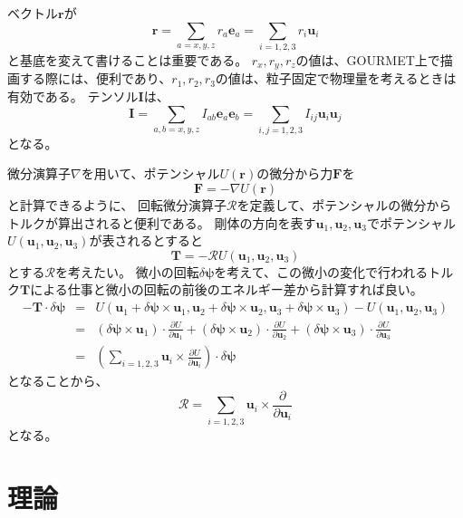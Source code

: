 \documentclass[a4paper,11pt]{jbook}
\def\vecR {\bm {\mathcal {R} } }
\begin{document}
ベクトル$\bm{r}$が
\begin{equation}
\bm{r}=\sum_{a=x,y,z}r_a\bm{e}_a=\sum_{i=1,2,3}r_i\bm{u}_i
\end{equation}
と基底を変えて書けることは重要である。
$r_x,r_y,r_z$の値は、GOURMET上で描画する際には、便利であり、$r_1,r_2,r_3$の値は、粒子固定で物理量を考えるときは有効である。
テンソル$\bm{I}$は、
\begin{equation}
\bm{I}=\sum_{a,b=x,y,z}I_{ab}\bm{e}_a\bm{e}_b=\sum_{i,j=1,2,3}I_{ij}\bm{u}_i\bm{u}_j
\end{equation}
となる。

微分演算子$\nabla$を用いて、ポテンシャル$U(\bm{r})$の微分から力$\bm{F}$を
\begin{equation}
\bm{F}=-\nabla U(\bm{r})
\end{equation}
と計算できるように、
回転微分演算子$\vecR$を定義して、ポテンシャルの微分からトルクが算出されると便利である。
剛体の方向を表す$\bm{u}_1,\bm{u}_2,\bm{u}_3$でポテンシャル$U(\bm{u}_1,\bm{u}_2,\bm{u}_3)$が表されるとすると
\begin{equation}
\bm{T}=-\vecR U(\bm{u}_1,\bm{u}_2,\bm{u}_3)
\end{equation}
とする$\vecR$を考えたい。
微小の回転$\delta\bm{\psi}$を考えて、この微小の変化で行われるトルク$\bm{T}$による仕事と微小の回転の前後のエネルギー差から計算すれば良い。
\begin{eqnarray}
-\bm{T}\cdot\delta\bm{\psi}
&=&U(\bm{u}_1+\delta\bm{\psi}\times\bm{u}_1,\bm{u}_2+\delta\bm{\psi}\times\bm{u}_2,\bm{u}_3+\delta\bm{\psi}\times\bm{u}_3)
-U(\bm{u}_1,\bm{u}_2,\bm{u}_3)
\nonumber \\
&=&\left(\delta\bm{\psi}\times\bm{u}_1\right)\cdot\frac{\partial U}{\partial \bm{u}_1}
+\left(\delta\bm{\psi}\times\bm{u}_2\right)\cdot\frac{\partial U}{\partial \bm{u}_2}
+\left(\delta\bm{\psi}\times\bm{u}_3\right)\cdot\frac{\partial U}{\partial \bm{u}_3}\nonumber\\
&=&\left(\sum_{i=1,2,3}\bm{u}_i\times\frac{\partial U}{\partial \bm{u}_i}\right) \cdot\delta\bm{\psi}
\end{eqnarray}
となることから、
\begin{equation}
\vecR=\sum_{i=1,2,3}\bm{u}_i\times\frac{\partial }{\partial \bm{u}_i}
\end{equation}
となる。

\chapter{理論}
\end{document}
